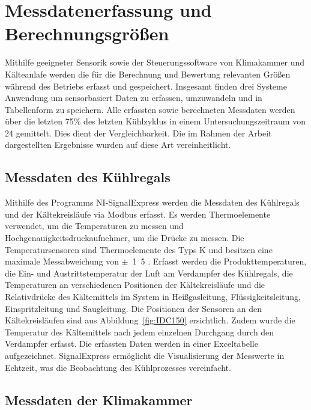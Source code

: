 \section{Messdatenerfassung und Berechnungsgrößen}
\label{sec:Erfassung von Messdaten}

Mithilfe geeigneter Sensorik sowie der Steuerungssoftware von Klimakammer und Kälteanlafe werden die für die Berechnung und Bewertung relevanten Größen während des Betriebs erfasst und gespeichert. Insgesamt finden drei Systeme Anwendung um sensorbasiert Daten zu erfassen, umzuwandeln und in Tabellenform zu speichern. Alle erfassten sowie berechneten Messdaten werden über die letzten \unit{75}{\%} des letzten Kühlzyklus in einem Untersuchungszeitraum von \unit{24}{\hour} gemittelt. Dies dient der Vergleichbarkeit. Die im Rahmen der Arbeit dargestellten Ergebnisse wurden auf diese Art vereinheitlicht.


\subsection{Messdaten des Kühlregals}
\label{subsec:Messdaten der Klimakammer}

Mithilfe des Programms NI-SignalExpress werden die Messdaten des Kühlregals und der Kältekreisläufe via Modbus erfasst. Es werden Thermoelemente verwendet, um die Temperaturen zu messen und Hochgenauigkeitsdruckaufnehmer, um die Drücke zu messen. Die Temperatursensoren sind Thermoelemente des Typs K und besitzen eine maximale Messabweichung von $\pm$~\unit{1.5}{\kelvin} \cite{WIKAAlexanderWiegandSE&Co.KG.2016}. Erfasst werden die Produkttemperaturen, die Ein- und Austrittstemperatur der Luft am Verdampfer des Kühlregals, die Temperaturen an verschiedenen Positionen der Kältekreisläufe und die Relativdrücke des Kältemittels im System in Heißgasleitung, Flüssigkeitsleitung, Einspritzleitung und Saugleitung. Die Positionen der Sensoren an den Kältekreisläufen sind aus Abbildung~\ref{fig:IDC150} ersichtlich. Zudem wurde die Temperatur des Kältemittels nach jedem einzelnen Durchgang durch den Verdampfer erfasst.
Die erfassten Daten werden in einer Exceltabelle aufgezeichnet. SignalExpress ermöglicht die Visualisierung der Messwerte in Echtzeit, was die Beobachtung des Kühlprozesses vereinfacht.

\subsection{Messdaten der Klimakammer}
\label{subsec:Messdaten der Klimakammer}

